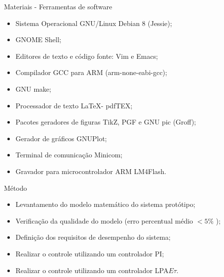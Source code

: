 \begin{frame}{Materiais - Ferramentas de software}
\begin{itemize}
\item Sistema Operacional GNU/Linux Debian 8 (Jessie);
\item GNOME Shell;
\item Editores de texto e código fonte: Vim e Emacs;
\item Compilador GCC para ARM (arm-none-eabi-gcc);
\item GNU make;
\item Processador de texto \LaTeX - pdfTEX;
\item Pacotes geradores de figuras TikZ, PGF e GNU pic (Groff);
\item Gerador de gráficos GNUPlot;
\item Terminal de comunicação Minicom;
\item Gravador para microcontrolador ARM LM4Flash.
\end{itemize}
\end{frame}




\begin{frame}{Método}
  \begin{itemize}
    \item Levantamento do modelo matemático do sistema protótipo;
    \item Verificação da qualidade do modelo (erro percentual médio $< 5\%$ );
    \item Definição dos requisitos de desempenho do sistema;
    \item Realizar o controle utilizando um controlador PI;
    \item Realizar o controle utilizando um controlador LPA$E\tau$.
  \end{itemize}
\end{frame}





